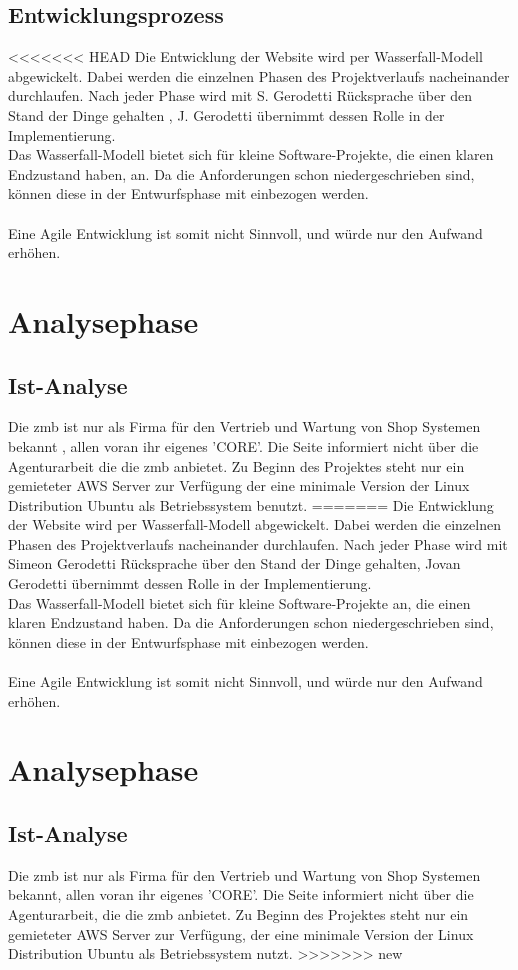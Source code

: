 \documentclass[11pt,a4paper]{article}
\begin{document}
\subsection{Entwicklungsprozess}
<<<<<<< HEAD
Die Entwicklung der Website wird per Wasserfall-Modell abgewickelt. Dabei werden die einzelnen Phasen des Projektverlaufs nacheinander durchlaufen. Nach jeder Phase wird mit S. Gerodetti Rücksprache über den Stand der Dinge gehalten , J. Gerodetti übernimmt dessen Rolle in der Implementierung.\\
Das Wasserfall-Modell bietet sich für kleine Software-Projekte, die einen klaren Endzustand haben, an. Da die Anforderungen schon niedergeschrieben sind, können diese in der Entwurfsphase mit einbezogen werden. \\\\
Eine Agile Entwicklung ist somit nicht Sinnvoll, und würde nur den Aufwand erhöhen.
\section{Analysephase}
\subsection{Ist-Analyse}
Die zmb ist nur als Firma für den Vertrieb und Wartung von Shop Systemen bekannt , allen voran ihr eigenes 'CORE'. Die Seite informiert nicht über die Agenturarbeit die die zmb anbietet.
Zu Beginn des Projektes steht nur ein gemieteter AWS Server zur Verfügung der eine minimale   Version der Linux Distribution Ubuntu als Betriebssystem benutzt.
=======
Die Entwicklung der Website wird per Wasserfall-Modell abgewickelt. Dabei werden die einzelnen Phasen des Projektverlaufs nacheinander durchlaufen. Nach jeder Phase wird mit Simeon Gerodetti Rücksprache über den Stand der Dinge gehalten, Jovan Gerodetti übernimmt dessen Rolle in der Implementierung.\\
Das Wasserfall-Modell bietet sich für kleine Software-Projekte an, die einen klaren Endzustand haben. Da die Anforderungen schon niedergeschrieben sind, können diese in der Entwurfsphase mit einbezogen werden. \\\\
Eine Agile Entwicklung ist somit nicht Sinnvoll, und würde nur den Aufwand erhöhen.
\section{Analysephase}
\subsection{Ist-Analyse}
Die zmb ist nur als Firma für den Vertrieb und Wartung von Shop Systemen bekannt, allen voran ihr eigenes 'CORE'. Die Seite informiert nicht über die Agenturarbeit, die die zmb anbietet. 
Zu Beginn des Projektes steht nur ein gemieteter AWS Server zur Verfügung, der eine minimale Version der Linux Distribution Ubuntu als Betriebssystem nutzt. 
>>>>>>> new
\end{document}
